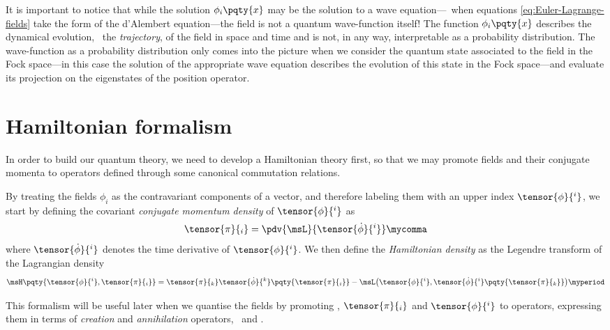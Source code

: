         It is important to notice that while the solution $\phi_i\pqty{x}$ may be the solution to a wave equation---\latineg\ when equations \eqref{eq:Euler-Lagrange-fields} take the form of the d'Alembert equation---the field is not a quantum wave-function itself! The function $\phi_i\pqty{x}$ describes the dynamical evolution, \latinie\ the \emph{trajectory}, of the field in space and time and is not, in any way, interpretable as a probability distribution.
        The wave-function as a probability distribution only comes into the picture when we consider the quantum state associated to the field in the Fock space---in this case the solution of the appropriate wave equation describes the evolution of this state in the Fock space---and evaluate its projection on the eigenstates of the position operator.

    \section{Hamiltonian formalism}
        In order to build our quantum theory, we need to develop a Hamiltonian theory first, so that we may promote fields and their conjugate momenta to operators defined through some canonical commutation relations.

        By treating the fields $\phi_i$ as the contravariant components of a vector, and therefore labeling them with an upper index $\tensor{\phi}{^i}$, we start by defining the covariant \emph{conjugate momentum density} of $\tensor{\phi}{^i}$ as
        \begin{equation}
            \tensor{\pi}{_i} = \pdv{\msL}{\tensor{\dot{\phi}}{^i}}
            \mycomma
        \end{equation}
        where $\tensor{\dot{\phi}}{^i}$ denotes the time derivative of $\tensor{\phi}{^i}$.
        We then define the \emph{Hamiltonian density} as the Legendre transform of the Lagrangian density
        \begin{equation}
            \msH\pqty{\tensor{\phi}{^i}, \tensor{\pi}{_i}} = \tensor{\pi}{_k} \tensor{\dot{\phi}}{^k}\pqty{\tensor{\pi}{_i}} - \msL\bigl( \tensor{\phi}{^i}, \tensor{\dot{\phi}}{^i}\pqty{\tensor{\pi}{_k}}\bigr)
            \myperiod
        \end{equation}
        
        This formalism will be useful later when we quantise the fields by promoting \msH, $\tensor{\pi}{_i}$ and $\tensor{\phi}{^i}$ to operators, expressing them in terms of \emph{creation} and \emph{annihilation} operators, \ and .

